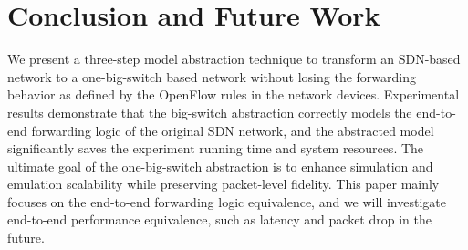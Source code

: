 \section{Conclusion and Future Work}
\label{Sec:conclusion}

We present a three-step model abstraction technique to transform an SDN-based network to a one-big-switch based network without losing the forwarding behavior as defined by the OpenFlow rules in the network devices.
Experimental results demonstrate that the big-switch abstraction correctly models the end-to-end forwarding logic of the original SDN network, and the abstracted model significantly saves the experiment running time and system resources. The ultimate goal of the one-big-switch abstraction is to enhance simulation and emulation scalability while preserving packet-level fidelity. This paper mainly focuses on the end-to-end forwarding logic equivalence, and we will investigate end-to-end performance equivalence, such as latency and packet drop in the future.
